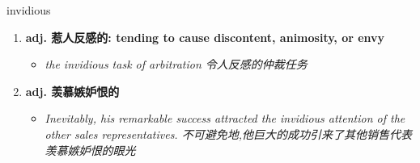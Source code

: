 
\begin{frame}
{\huge invidious}
\begin{center}
\begin{enumerate}\Large
  \item \textbf{adj. 惹人反感的: tending to cause discontent, animosity, or envy}
  \begin{itemize}
    \item \em{\Large{the invidious task of arbitration 令人反感的仲裁任务}}
  \end{itemize}
  \item \textbf{adj. 羡慕嫉妒恨的}
  \begin{itemize}
    \item \em{\Large{Inevitably, his remarkable success attracted the invidious attention of the other sales representatives. 不可避免地,他巨大的成功引来了其他销售代表羡慕嫉妒恨的眼光}}
  \end{itemize}
\end{enumerate}
\end{center}
\end{frame}
